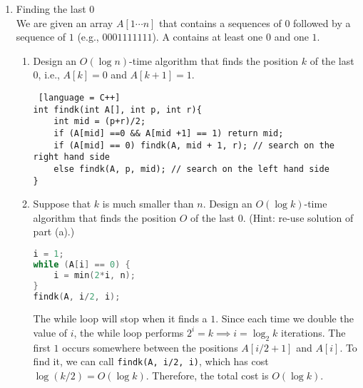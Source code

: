 \documentclass[11pt]{article}
\begin{document}
\begin{enumerate}
\item Finding the last 0\\
We are given an array $A[1 \cdots n]$ that contains a sequences of $0$ followed by a sequence of $1$ (e.g., $0001111111$). A contains at least one $0$ and one $1$.
\begin{enumerate}
\item Design an $O(\log n)$-time algorithm that finds the position $k$ of the last $0$, i.e., $A[k] = 0$ and $A[k+1] =1$.
\begin{lstlisting} [language = C++]
int findk(int A[], int p, int r){
	int mid = (p+r)/2;
	if (A[mid] ==0 && A[mid +1] == 1) return mid;
	if (A[mid] == 0) findk(A, mid + 1, r); // search on the right hand side
	else findk(A, p, mid); // search on the left hand side
}
\end{lstlisting}
\item Suppose that $k$ is much smaller than $n$. Design an $O(\log k)$-time algorithm that finds the position $O$ of the last $0$. (Hint: re-use solution of part (a).)
\begin{lstlisting}[language = C++]
i = 1;
while (A[i] == 0) {
	i = min(2*i, n);
}
findk(A, i/2, i);
\end{lstlisting}
The while loop will stop when it finds a $1$. Since each time we double the value of $i$, the while loop performs $2^i = k \implies i = \log_{2} k$ iterations. The first $1$ occurs somewhere between the positions $A[i/2 +1]$ and $A[i]$. To find it, we can call \texttt{findk(A, i/2, i)}, which has cost $\log (k/2) = O(\log k)$. Therefore, the total cost is $O(\log k)$.
\end{enumerate}
\end{enumerate}
\end{document}
